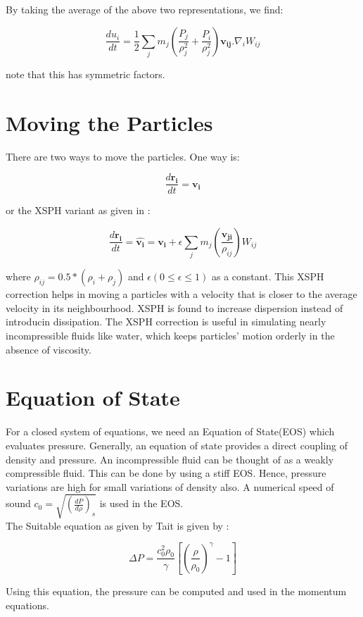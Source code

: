 \noindent
By taking the average of the above two representations, we find:

\begin{equation}
 \frac{du_i}{dt} = \frac{1}{2} \sum_j m_j \left( \frac{P_j}{\rho_j^2} + \frac{P_i}{\rho_j^2}\right)\mathbf{v_{ij}}.\nabla_i W_{ij}
\end{equation}

\noindent
note that this has symmetric factors.


\section{Moving the Particles}

There are two ways to move the particles. One way is:

\begin{equation}
 \frac{d\mathbf{r_i}}{dt} = \mathbf{v_i}
\end{equation}

\noindent
or the XSPH variant as given in \cite{Monaghan1983}:

\begin{equation}
\frac{d\mathbf{r_i}}{dt} = \hat {\mathbf{v_i}} = \mathbf{v_i} + \epsilon \sum_j m_j \left(\frac{\mathbf{v_{ji}}}{\rho_{ij}}\right) W_{ij}
\end{equation}

\noindent
where $\rho_{ij} = 0.5*(\rho_i + \rho_j)$ and $\epsilon (0 \leq \epsilon \leq 1)$ as a constant. 
This XSPH correction helps in moving a particles with a velocity that is closer to the
average velocity in its neighbourhood. XSPH is found to increase dispersion instead of introducin
dissipation. The XSPH correction is useful in simulating nearly incompressible fluids like water, which keeps 
particles' motion orderly in the absence of viscosity.

\section{Equation of State}

For a closed system of equations, we need an Equation of State(EOS) which evaluates pressure.
Generally, an equation of state provides a direct coupling of density and pressure. An incompressible fluid 
can be thought of as a weakly compressible fluid. This can be done by using a stiff EOS.
Hence, pressure variations are high for small variations of density also. A numerical speed of sound
$c_0 = \sqrt{\left(\frac{dP}{d\rho}\right)_s}$ is used in the EOS.\\

The Suitable equation as given by Tait is given by :

\begin{equation}
 \Delta P = \frac{c_0^2 \rho_0}{\gamma} \left[ \left( \frac{\rho}{\rho_0} \right)^{\gamma} - 1 \right]
\end{equation}

\noindent
Using this equation, the pressure can be computed and used in the momentum equations.

